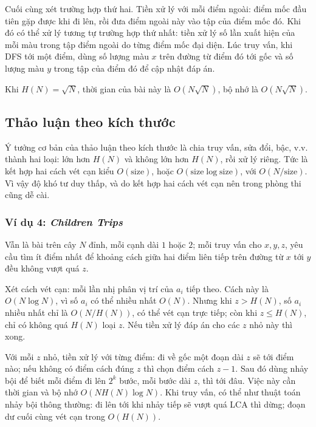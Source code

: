 \documentclass[11pt]{article}
\begin{document}
Cuối cùng xét trường hợp thứ hai. Tiền xử lý với mỗi điểm ngoài: điểm mốc đầu
tiên gặp được khi đi lên, rồi đưa điểm ngoài này vào tập của điểm mốc đó. Khi
đó có thể xử lý tương tự trường hợp thứ nhất: tiền xử lý số lần xuất hiện của
mỗi màu trong tập điểm ngoài do từng điểm mốc đại diện. Lúc truy vấn, khi DFS
tới một điểm, dùng số lượng màu \(x\) trên đường từ điểm đó tới gốc và số lượng
màu \(y\) trong tập của điểm đó để cập nhật đáp án.

Khi \(H(N)=\sqrt N\), thời gian của bài này là \(O(N\sqrt N)\), bộ nhớ là
\(O(N\sqrt N)\).

\subsection{Thảo luận theo kích thước}

Ý tưởng cơ bản của thảo luận theo kích thước là chia truy vấn, sửa đổi, bậc,
v.v. thành hai loại: lớn hơn \(H(N)\) và không lớn hơn \(H(N)\), rồi xử lý
riêng. Tức là kết hợp hai cách vét cạn kiểu \(O(\mathrm{size})\), hoặc
\(O(\mathrm{size}\log\mathrm{size})\), với \(O(N/\mathrm{size})\). Vì vậy độ
khó tư duy thấp, và do kết hợp hai cách vét cạn nên trong phòng thi cũng dễ
cài.

\subsubsection{\texorpdfstring{Ví dụ 4: \emph{Children Trips}}{Ví dụ 4: Children Trips}}

Vẫn là bài trên cây \(N\) đỉnh, mỗi cạnh dài \(1\) hoặc \(2\); mỗi truy vấn cho
\(x,y,z\), yêu cầu tìm ít điểm nhất để khoảng cách giữa hai điểm liên tiếp
trên đường từ \(x\) tới \(y\) đều không vượt quá \(z\).

Xét cách vét cạn: mỗi lần nhị phân vị trí của \(a_i\) tiếp theo. Cách này là
\(O(N\log N)\), vì số \(a_i\) có thể nhiều nhất \(O(N)\). Nhưng khi
\(z>H(N)\), số \(a_i\) nhiều nhất chỉ là \(O(N/H(N))\), có thể vét cạn trực
tiếp; còn khi \(z\le H(N)\), chỉ có không quá \(H(N)\) loại \(z\). Nếu tiền xử
lý đáp án cho các \(z\) nhỏ này thì xong.

Với mỗi \(z\) nhỏ, tiền xử lý với từng điểm: đi về gốc một đoạn dài \(z\) sẽ
tới điểm nào; nếu không có điểm cách đúng \(z\) thì chọn điểm cách \(z-1\).
Sau đó dùng nhảy bội để biết mỗi điểm đi lên \(2^k\) bước, mỗi bước dài \(z\),
thì tới đâu. Việc này cần thời gian và bộ nhớ \(O(NH(N)\log N)\). Khi truy vấn,
có thể như thuật toán nhảy bội thông thường: đi lên tới khi nhảy tiếp sẽ vượt
quá LCA thì dừng; đoạn dư cuối cùng vét cạn trong \(O(H(N))\).
\end{document}
